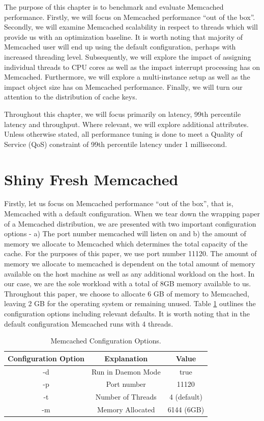 The purpose of this chapter is to benchmark and evaluate Memcached performance. Firstly, we will focus on Memcached performance ``out of the box''. Secondly, we will examine Memcached scalability in respect to threads which will provide us with an optimization baseline. It is worth noting that majority of Memcached user will end up using the default configuration, perhaps with increased threading level. Subsequently, we will explore the impact of assigning individual threads to CPU cores as well as the impact interrupt processing has on Memcached. Furthermore, we will explore a multi-instance setup as well as the impact object size has on Memcached performance. Finally, we will turn our attention to the distribution of cache keys.

Throughout this chapter, we will focus primarily on latency, 99th percentile latency and throughput. Where relevant, we will explore additional attributes. Unless otherwise stated, all performance tuning is done to meet a Quality of Service (QoS) constraint of 99th percentile latency under 1 millisecond.

\section{Shiny Fresh Memcached}
Firstly, let us focus on Memcached performance ``out of the box'', that is, Memcached with a default configuration. When we tear down the wrapping paper of a Memcached distribution, we are presented with two important configuration options - a) The port number memcached will listen on and b) the amount of memory we allocate to Memcached which determines the total capacity of the cache. For the purposes of this paper, we use port number 11120. The amount of memory we allocate to memcached is dependent on the total amount of memory available on the host machine as well as any additional workload on the host. In our case, we are the sole workload with a total of 8GB memory available to us. Throughout this paper, we choose to allocate 6 GB of memory to Memcached, leaving 2 GB for the operating system or remaining unused. Table \ref{tab:m_default_config} outlines the configuration options including relevant defaults. It is worth noting that in the default configuration Memcached runs with 4 threads.

\begin{table}[h!]
\centering
\begin{tabular}{| c c c |}
 \hline
 Configuration Option & Explanation & Value\\ [0.5ex]
 \hline\hline

 -d & Run in Daemon Mode & true \\
 -p & Port number & 11120 \\
 -t & Number of Threads & 4 (default) \\
 -m & Memory Allocated & 6144 (6GB) \\

 \hline

\end{tabular}
\caption{Memcached Configuration Options.}
\label{tab:m_default_config}
\end{table}


